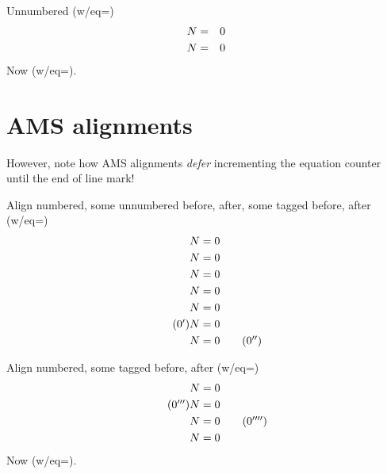 \documentclass{article}
\begin{document}
Unnumbered (w/eq=\theequation)
\begin{eqnarray*}
N&=&\mbox{\theequation} \\
N&=&\mbox{\theequation}
\end{eqnarray*}
Now  (w/eq=\theequation).

\section{AMS alignments}
However, note how AMS alignments \emph{defer} incrementing the equation counter
until the end of line mark!

Align numbered, some unnumbered before, after, some tagged before, after (w/eq=\theequation)
\begin{align}
N&=\mbox{\theequation} \\
N&=\mbox{\theequation} \\
\nonumber N&=\mbox{\theequation} \\
N&=\mbox{\theequation} \nonumber\\
N&=\mbox{\theequation} \\
\tag{\theequation$'$} N&=\mbox{\theequation} \\
N&=\mbox{\theequation} \tag{\theequation$''$}
\end{align}

Align numbered, some tagged before, after (w/eq=\theequation)
\begin{align*}
N&=\mbox{\theequation} \\
\tag{\theequation$'''$} N&=\mbox{\theequation} \\
N&=\mbox{\theequation} \tag{\theequation$''''$}\\
N&=\mbox{\theequation} \\
\end{align*}
Now (w/eq=\theequation).
\end{document}
